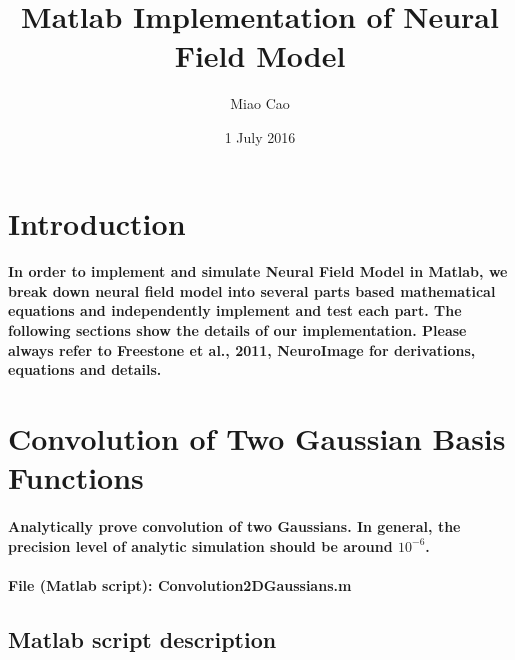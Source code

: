 \documentclass[a4paper, 12pt, english]{article}
\title{Matlab Implementation of Neural Field Model}
\author{Miao Cao}
\date{1 July 2016}
\begin{document}
\onehalfspacing

\begin{titlepage}\centering
\vspace*{\fill}
\maketitle
\vspace*{\fill}
\end{titlepage}

\tableofcontents

\newpage



\section{Introduction}
\paragraph{In order to implement and simulate Neural Field Model in Matlab, we break down
neural field model into several parts based mathematical equations and independently implement and test each part. The
following sections show the details of our implementation. Please always refer to
Freestone et al., 2011, NeuroImage for derivations, equations and details.}

\newpage




\section{Convolution of Two Gaussian Basis Functions}

\paragraph{Analytically prove convolution of two Gaussians. In general, the
precision level of analytic simulation should be around $10^{-6}$.}

\paragraph{File (Matlab script): Convolution2DGaussians.m}

\subsection*{Matlab script description}
\end{document}
